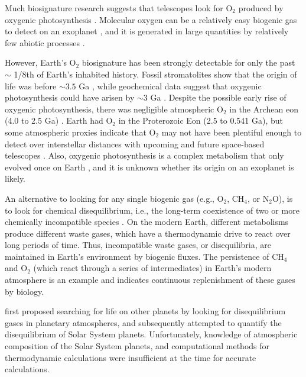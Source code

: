 Much biosignature research suggests that telescopes look for O$_2$ produced by oxygenic photosynthesis \citep{Meadows_2017,Meadows_2018,Owen_1980}. Molecular oxygen can be a relatively easy biogenic gas to detect on an exoplanet \citep{Meadows_2017}, and it is generated in large quantities by relatively few abiotic processes \citep{Meadows_2018}.

However, Earth's O$_2$ biosignature has been strongly detectable for only the past $\sim$ 1/8th of Earth's inhabited history. Fossil stromatolites show that the origin of life was before $\sim 3.5$ Ga \citep{Walter_1980}, while geochemical data suggest that oxygenic photosynthesis could have arisen by $\sim 3$ Ga \citep{Planavsky_2014}. Despite the possible early rise of oxygenic photosynthesis, there was negligible atmospheric O$_2$ in the Archean eon (4.0 to 2.5 Ga) \citep{Farquhar_2000}. Earth had O$_2$ in the Proterozoic Eon (2.5 to 0.541 Ga), but some atmospheric proxies \citep{Planavsky_2014b} indicate that O$_2$ may not have been plentiful enough to detect over interstellar distances with upcoming and future space-based telescopes \citep{KrissansenTotton_2018b,Reinhard_2017}. Also, oxygenic photosynthesis is a complex metabolism that only evolved once on Earth \citep{Fischer_2016}, and it is unknown whether its origin on an exoplanet is likely.

An alternative to looking for any single biogenic gas (e.g., O$_2$, CH$_4$, or N$_2$O), is to look for chemical disequilibrium, i.e., the long-term coexistence of two or more chemically incompatible species \citep{Lovelock_1965,Lovelock_1975}. On the modern Earth, different metabolisms produce different waste gases, which have a thermodynamic drive to react over long periods of time. Thus, incompatible waste gases, or disequilibria, are maintained in Earth's environment by biogenic fluxes. The persistence of CH$_4$ and O$_2$ (which react through a series of intermediates) in Earth's modern atmosphere is an example and indicates continuous replenishment of these gases by biology. 

\citet{Lovelock_1965} first proposed searching for life on other planets by looking for disequilibrium gases in planetary atmospheres, and subsequently \citet{Lovelock_1975} attempted to quantify the disequilibrium of Solar System planets. Unfortunately, knowledge of atmospheric composition of the Solar System planets, and computational methods for thermodynamic calculations were insufficient at the time for accurate calculations.

